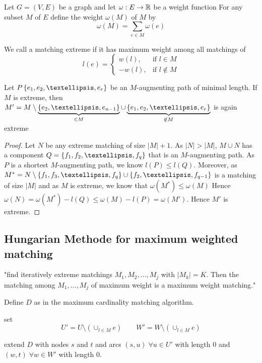 Let $G=(V,E)$ be a graph and let $\omega: E \rightarrow \mathbb{R}$ be a weight function
For any subset $M$ of $E$ define the weight $\omega(M)$ of $M$ by \[
	\omega(M) = \sum\limits_{e \in M}\omega(e)
\]

\begin{defn+}
	We call a matching extreme if it has maximum weight among all matchings of 
	\[
		l(e) =
		\begin{cases}
			w(l), & \text{if } l\in M \\
			-w(l), & \text{if } l \not \in M
		\end{cases}
	\]	
\end{defn+}

\begin{lem}
	Let $P \plainset{e_1, e_2, …, e_r}$ be an $M$-augmenting path of minimal length.
	If $M$ is extreme, then $M' = M \setminus \underbrace{\plainset{e_2, …, e_{n-1}}}_{\in M} \cup \underbrace{\plainset{e_1, e_2, …, e_r}}_{\not \in M}$ is again extreme
\end{lem}

\begin{proof}
	Let $N$ be any extreme matching of size $|M| + 1$. As $|N| > |M|$, $M \cup N$
	has a component $Q = \plainset{f_1, f_2, …, f_q}$ that is an $M$-augmenting path.
	As $P$ is a shortest $M$-augmenting path, we know $l(P) \leq l(Q)$. Moreover,
	as $M^*=N\setminus \plainset{f_1, f_3, …, f_q} \cup \plainset{f_2, …, f_{q-1}}$ 
	is a matching of size $|M|$ and as $M$ is extreme, we know that $\omega(M^*) \leq \omega(M)$
	Hence $\omega(N) = \omega(M^*) - l(Q) \leq \omega (M) - l(P) = \omega(M')$.
	Hence $M'$ is extreme.
\end{proof}

\subsection*{Hungarian Methode for maximum weighted matching}
"find iteratively extreme matchings $M_1, M_2, …, M_j$ with $|M_k|=K$. Then the
matching among $M_1, …, M_j$ of maximum weight is a maximum weight matching."

Define  $D$ as in the maximum cardinality matching algorithm.

set \[U'=U\setminus (\cup_{l\in M}e) \qquad W'=W\setminus ( \cup_{l \in M}e) \]

extend $D$ with nodes $s$ and $t$ and arcs $(s,u) \; \forall u \in U'$ with 
length $0$ and $(w,t) \; \forall w \in W'$ with length $0$.

